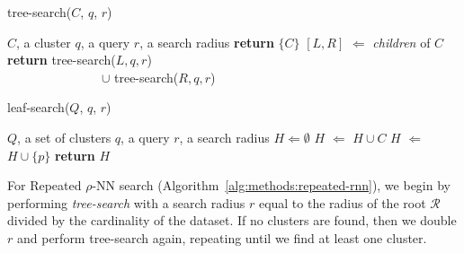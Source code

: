 \begin{minipage}{.425\textwidth}
    \begin{algorithm}[H]
        \caption{tree-search($C$, $q$, $r$)}
        \label{alg:methods:rnn-search:tree-search}
        \begin{algorithmic}
            \Require $C$, a cluster
            \Require $q$, a query
            \Require $r$, a search radius
                \State \textbf{return} $\{C\}$
            \Else
                \State $[L, R]$ $\Leftarrow$ \textit{children} of $C$
                \State \textbf{return} tree-search($L, q, r$) \\
                \ \ \ \ \ \ \ \ \ \ \ \ \ \ \ $\cup$ tree-search($R, q, r$)
            \EndIf
        \end{algorithmic}
    \end{algorithm}
\end{minipage}
\hfill
\begin{minipage}{.475\textwidth}
    \begin{algorithm}[H]
        \caption{leaf-search($Q$, $q$, $r$)}
        \label{alg:methods:rnn-search:leaf-search}
        \begin{algorithmic}
            \Require $Q$, a set of clusters
            \Require $q$, a query
            \Require $r$, a search radius
            \State $H \Leftarrow \emptyset$
                    \State $H$ $\Leftarrow$ $H \cup C$
                \Else
                            \State $H$ $\Leftarrow$ $H \cup \{p\}$
                        \EndIf
                    \EndFor
                \EndIf
            \EndFor
            \State \textbf{return} $H$
        \end{algorithmic}
    \end{algorithm}
\end{minipage}

For Repeated $\rho$-NN search (Algorithm~\ref{alg:methods:repeated-rnn}), we begin by performing \textit{tree-search} with a search radius $r$ equal to the radius of the root $\mathcal{R}$ divided by the cardinality of the dataset.
If no clusters are found, then we double $r$ and perform tree-search again, repeating until we find at least one cluster.


